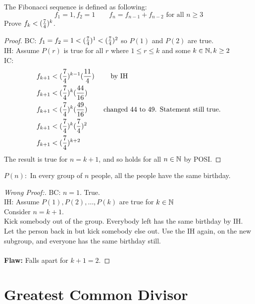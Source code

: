\documentclass[english, 12pt]{article}
\begin{document}
\begin{exmp}
The Fibonacci sequence is defined as following:
\[f_{1} = 1, f_{2} = 1\qquad f_{n}=f_{n-1}+ f_{n-2} \text{ for all } n \geq 3\]
Prove $f_{k} < (\frac{7}{4})^k$.
\begin{proof}
BC: $f_{1} = f_{2} = 1 < (\frac{7}{4})^1 < (\frac{7}{4})^2$ so $P(1)$ and $P(2)$ are true.\\
IH: Assume $P(r)$ is true for all $r$ where $1 \leq r \leq k$ and some $k \in {\mathbb{N}}, k \geq 2$\\
IC:
\begin{align*}
 & f_{k+1} < (\frac{7}{4})^{k-1} (\frac{11}{4}) \qquad \text{ by IH}\\
 & f_{k+1} < (\frac{7}{4})^k (\frac{44}{16}) \\
 & f_{k+1} < (\frac{7}{4})^k (\frac{49}{16}) \qquad \text{ changed $44$ to $49$.  Statement still true.}\\
 & f_{k+1} < (\frac{7}{4})^k(\frac{7}{4})^2 \\
 & f_{k+1} < (\frac{7}{4})^{k+2} 
\end{align*}
The result is true for $n = k+1$, and so holds for all $n\in{\mathbb{N}}$ by POSI.
\end{proof}
\end{exmp}

\begin{exmp}
$P(n): $ In every group of $n$ people, all the people have the same birthday. 
\begin{proof}[Wrong Proof:]
BC: $n=1$. True. \\
IH: Assume $P(1), P(2),\dots, P(k)$ are true for $k \in {\mathbb{N}}$\\
Consider $n=k+1$. \\
Kick somebody out of the group. Everybody left has the same birthday by IH. Let the person back in but kick somebody else out. Use the IH again, on the new subgroup, and everyone has the same birthday still. \\\\ 
\textbf{Flaw:} Falls apart for $k+1=2$.
\end{proof}
\end{exmp}
\section{Greatest Common Divisor}
\end{document}

